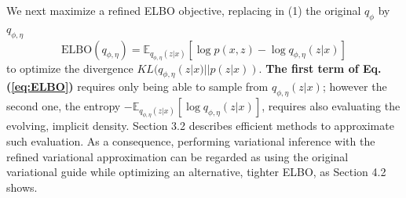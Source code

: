 We next maximize a refined ELBO objective, replacing in (1) the 
original $q_{\phi }$ 
by $q_{\phi, \eta}$
\begin{equation}\label{eq:ELBO}
\mbox{ELBO}(q_{\phi,\eta}) = \mathbb{E}_{q_{\phi, \eta}(z|x)} \left[ \log p(x,z) - \log q_{\phi, \eta}(z|x)\right]
\end{equation}
to optimize the divergence $KL(q_{\phi,\eta}(z|x) ||  p(z|x))$. {\bf{The first term of Eq. (\ref{eq:ELBO})}}
requires only being able to sample from $q_{\phi,\eta}(z|x)$; however the second
one, the entropy
$-\mathbb{E}_{q_{\phi,\eta}(z|x)} \left[ \log q_{\phi,\eta}(z | x) \right]$, requires also evaluating the evolving, implicit density.
Section 3.2 describes efficient methods to approximate 
 such 
evaluation. As a consequence, performing variational inference with the refined variational approximation can be regarded as using the original variational guide while optimizing an alternative, tighter ELBO, as Section 4.2 shows. 

